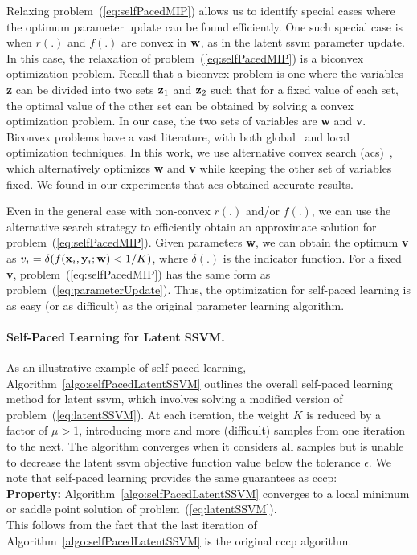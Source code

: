 \documentclass{article}
\newcommand{\myparagraph}[1]{\vspace{-2mm}\paragraph{#1}}
\begin{document}
Relaxing problem~(\ref{eq:selfPacedMIP}) allows us to identify special cases
where the optimum parameter update can be found efficiently. One such special case is when $r(.)$
and $f(.)$ are convex in ${\bf w}$, as in the latent {\sc ssvm} parameter update. In this case, the
relaxation of problem~(\ref{eq:selfPacedMIP}) is a biconvex optimization problem.
Recall that a biconvex problem is one
where the variables {\bf z} can be divided into two sets ${\bf z}_1$
and ${\bf z}_2$ such that for a fixed value of each set, the optimal
value of the other set can be obtained by solving a convex
optimization problem. In our case, the two sets of variables are
{\bf w} and {\bf v}. Biconvex problems have a vast literature, with both global~\cite{floudasjota93}
and local~\cite{bazaraa93} optimization techniques. In this work, we use alternative convex search ({\sc acs})~\cite{bazaraa93}, which alternatively optimizes
{\bf w} and {\bf v} while keeping the other set of variables fixed. We found in our experiments 
that {\sc acs} obtained accurate results.

Even in the general case with non-convex $r(.)$ and/or $f(.)$, we can use the alternative search strategy to efficiently
obtain an approximate solution for problem~(\ref{eq:selfPacedMIP}). Given parameters {\bf w}, we can obtain the optimum
{\bf v} as $v_i = \delta(f({\bf x}_i,{\bf y}_i;{\bf w}) < 1/K)$, where $\delta(.)$ is the indicator function.
For a fixed {\bf v}, problem~(\ref{eq:selfPacedMIP}) has the same form as problem~(\ref{eq:parameterUpdate}). Thus, the
optimization for self-paced learning is as easy (or as difficult) as the original parameter learning algorithm.

\myparagraph{Self-Paced Learning for Latent SSVM.} As an illustrative
example of self-paced learning,
Algorithm~\ref{algo:selfPacedLatentSSVM} outlines the overall
self-paced learning method for latent {\sc ssvm}, which involves
solving a modified version of problem~(\ref{eq:latentSSVM}).  At each
iteration, the weight $K$ is reduced by a factor of $\mu > 1$,
introducing more and more (difficult) samples from one iteration to
the next.  The algorithm converges when it considers all samples but
is unable to decrease the latent {\sc ssvm} objective function value
below the tolerance $\epsilon$.  We note that self-paced learning
provides the same guarantees as {\sc cccp}:\\ {\bf Property:}
Algorithm~\ref{algo:selfPacedLatentSSVM} converges to a local minimum
or saddle point solution of problem~(\ref{eq:latentSSVM}). \\ This
follows from the fact that the last iteration of
Algorithm~\ref{algo:selfPacedLatentSSVM} is
the original {\sc
cccp} algorithm.
\end{document}
